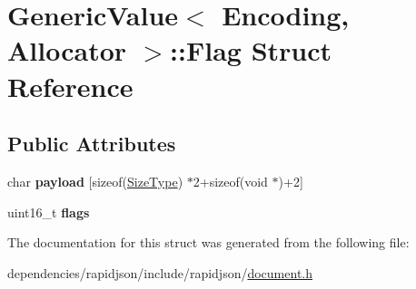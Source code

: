 \hypertarget{struct_generic_value_1_1_flag}{}\section{Generic\+Value$<$ Encoding, Allocator $>$\+:\+:Flag Struct Reference}
\label{struct_generic_value_1_1_flag}
\subsection*{Public Attributes}
\begin{DoxyCompactItemize}
\item 
\mbox{\label{struct_generic_value_1_1_flag_aced7ede2056a797fb80817d45634e3ea}} 
char {\bfseries payload} \mbox{[}sizeof(\hyperlink{rapidjson_8h_a5ed6e6e67250fadbd041127e6386dcb5}{Size\+Type}) $\ast$2+sizeof(void $\ast$)+2\mbox{]}
\item 
\mbox{\label{struct_generic_value_1_1_flag_ac91f08067dcc0003fc78e870ca9b2d5d}} 
uint16\+\_\+t {\bfseries flags}
\end{DoxyCompactItemize}


The documentation for this struct was generated from the following file\+:\begin{DoxyCompactItemize}
\item 
dependencies/rapidjson/include/rapidjson/\hyperlink{document_8h}{document.\+h}\end{DoxyCompactItemize}
